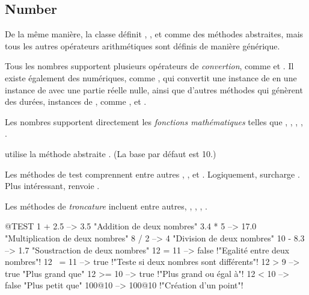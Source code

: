 \documentclass[a4paper,10pt,twoside]{book}
\begin{document}
\subsection{Number}

De la même manière, la classe  définit , ,  et  comme des méthodes abstraites, mais tous les autres opérateurs arithmétiques sont définis de manière générique.

Tous les nombres supportent plusieurs opérateurs de  \emph{convertion}, comme  et . Il existe également des  numériques,
comme , qui convertit une instance de  en une instance de  avec une partie réelle nulle, ainsi que d'autres méthodes qui génèrent des durées, instances de , comme ,  et .

Les nombres supportent directement les \emph{fonctions mathématiques} telles que , , , , .

 utilise la méthode abstraite . (La base par défaut est 10.)

Les méthodes de test comprennent entre autres , ,  et . Logiquement,  surcharge . Plus intéressant,  renvoie .

Les méthodes de \emph{troncature} incluent entre autres, , , , .

\begin{code}{@TEST}
1 + 2.5     --> 3.5             "Addition de deux nombres"
3.4 * 5      --> 17.0           "Multiplication de deux nombres"
8 / 2         --> 4                 "Division de deux nombres"
10 - 8.3   --> 1.7              "Soustraction de deux nombres"
12 = 11    --> false           !"Egalité entre deux nombres"!
12 ~= 11 --> true            !"Teste si deux nombres sont différents"!
12 > 9      --> true            "Plus grand que"
12 >= 10  --> true            !"Plus grand ou égal à"!
12 < 10    --> false           "Plus petit que"
100@10   --> 100@10    !"Création d'un point"!
\end{code}
\end{document}
